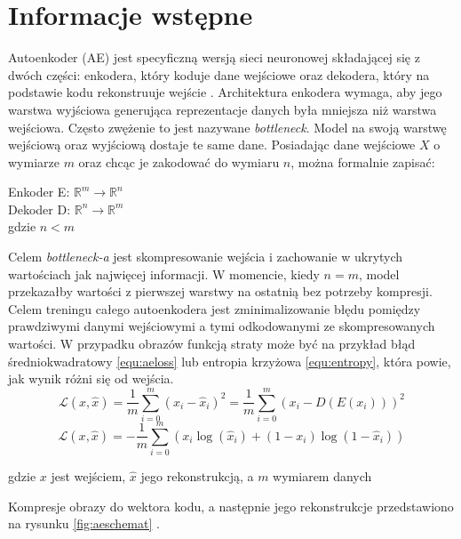 \documentclass[a4paper,12pt,oneside]{book} %
\begin{document}
\section{Informacje wstępne}
Autoenkoder (AE) jest specyficzną wersją sieci neuronowej składającej się z dwóch części: enkodera, który koduje dane wejściowe oraz dekodera, który na podstawie kodu rekonstruuje wejście \cite{bank2021autoencoders}. Architektura enkodera wymaga, aby jego warstwa wyjściowa generująca reprezentacje danych była mniejsza niż warstwa wejściowa. Często zwężenie to jest nazywane \textit{bottleneck}. Model na swoją warstwę wejściową oraz wyjściową dostaje te same dane. Posiadając dane wejściowe $X$ o wymiarze $m$ oraz chcąc je zakodować do wymiaru $n$, można formalnie zapisać:

\begin{center}
	Enkoder E: $\mathbb{R}^m \rightarrow \mathbb{R}^n$\\
	Dekoder D: $\mathbb{R}^n \rightarrow \mathbb{R}^m$\\
	gdzie $n < m$\\
\end{center}
Celem \textit{bottleneck-a} jest skompresowanie wejścia i zachowanie w ukrytych wartościach jak najwięcej informacji. W momencie, kiedy $n = m$, model przekazałby wartości z pierwszej warstwy na ostatnią bez potrzeby kompresji. Celem treningu całego autoenkodera jest zminimalizowanie błędu pomiędzy prawdziwymi danymi wejściowymi a tymi odkodowanymi ze skompresowanych wartości. W przypadku obrazów funkcją straty może być na przykład błąd średniokwadratowy \ref{equ:aeloss} lub entropia krzyżowa \ref{equ:entropy}, która powie, jak wynik różni się od wejścia. 
 \begin{equation}
 		 \mathcal{L}(x, \hat{x}) = \dfrac{1}{m}\displaystyle\sum_{i=0}^{m}(x_i-\hat{x}_i)^2 =\dfrac{1}{m}\displaystyle\sum_{i=0}^{m}(x_i-D(E(x_i)))^2
 		 \label{equ:aeloss}
 \end{equation}
 \begin{equation}
	\mathcal{L}(x, \hat{x}) = -\dfrac{1}{m}\displaystyle\sum_{i=0}^{m}(x_i\log(\hat{x}_i) + (1 -x_i)\log(1-\hat{x}_i))
	\label{equ:entropy}
\end{equation}
\begin{center}
	gdzie $x$ jest wejściem, $\hat{x}$ jego rekonstrukcją, a $m$ wymiarem danych
\end{center}
Kompresje obrazy do wektora kodu, a następnie jego rekonstrukcje przedstawiono na rysunku \ref{fig:aeschemat} \cite{bank2021autoencoders}.
\end{document}
